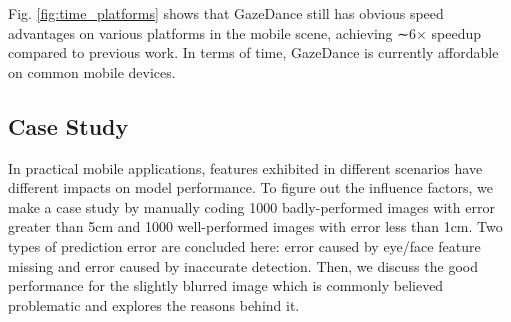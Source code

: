 \documentclass[acmlarge]{acmart}
\begin{document}

Fig. \ref{fig:time_platforms} shows that GazeDance still has obvious speed advantages on various platforms in the mobile scene, achieving ∼6× speedup compared to previous work. In terms of time, GazeDance is currently affordable on common mobile devices.


\subsection{Case Study} \label{analy}
In practical mobile applications, features exhibited in different scenarios have different impacts on model performance. To figure out the influence factors, we make a case study by manually coding 1000 badly-performed images with error greater than 5cm and 1000 well-performed images with error less than 1cm. Two types of prediction error are concluded here: error caused by eye/face feature missing and error caused by inaccurate detection. Then, we discuss the good performance for the slightly blurred image which is commonly believed problematic and explores the reasons behind it. 
\end{document}
